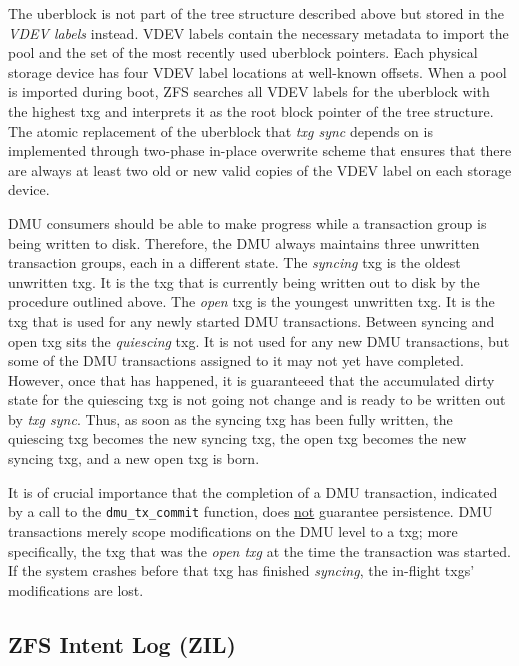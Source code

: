 \documentclass[12pt,a4paper,twoside]{book}
\begin{document}
The uberblock is not part of the tree structure described above but stored in the \textit{VDEV labels} instead.
VDEV labels contain the necessary metadata to import the pool and the set of the most recently used uberblock pointers.
Each physical storage device has four VDEV label locations at well-known offsets.
When a pool is imported during boot, ZFS searches all VDEV labels for the uberblock with the highest txg and interprets it as the root block pointer of the tree structure.
The atomic replacement of the uberblock that \textit{txg sync} depends on is implemented through two-phase in-place overwrite scheme that ensures that there are always at least two old or new valid copies of the VDEV label on each storage device.

DMU consumers should be able to make progress while a transaction group is being written to disk.
Therefore, the DMU always maintains three unwritten transaction groups, each in a different state.
The \textit{syncing} txg is the oldest unwritten txg.
It is the txg that is currently being written out to disk by the procedure outlined above.
The \textit{open} txg is the youngest unwritten txg.
It is the txg that is used for any newly started DMU transactions.
Between syncing and open txg sits the \textit{quiescing} txg.
It is not used for any new DMU transactions, but some of the DMU transactions assigned to it may not yet have completed.
However, once that has happened, it is guaranteeed that the accumulated dirty state for the quiescing txg is not going not change and is ready to be written out by \textit{txg sync}.
Thus, as soon as the syncing txg has been fully written, the quiescing txg becomes the new syncing txg, the open txg becomes the new syncing txg, and a new open txg is born.

It is of crucial importance that the completion of a DMU transaction, indicated by a call to the \lstinline{dmu_tx_commit} function, does \underline{not} guarantee persistence.
DMU transactions merely scope modifications on the DMU level to a txg; more specifically, the txg that was the \textit{open txg} at the time the transaction was started.
If the system crashes before that txg has finished \textit{syncing}, the in-flight txgs' modifications are lost.

\subsection{ZFS Intent Log (ZIL)}\label{openzfs:the_zil_api}
\end{document}
